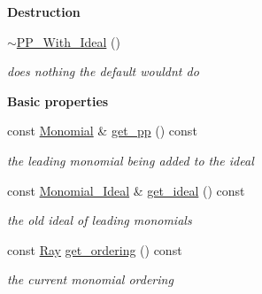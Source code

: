 \begin{Indent}\textbf{ Destruction}\par
\begin{DoxyCompactItemize}
\item 
\mbox{\label{group___g_b_computation_a1dd0ce9a355f10837a180b1599a2666f}} 
\hyperlink{group___g_b_computation_a1dd0ce9a355f10837a180b1599a2666f}{$\sim$\+P\+P\+\_\+\+With\+\_\+\+Ideal} ()
\begin{DoxyCompactList}\small\item\em does nothing the default wouldn\textquotesingle{}t do \end{DoxyCompactList}\end{DoxyCompactItemize}
\end{Indent}
\begin{Indent}\textbf{ Basic properties}\par
\begin{DoxyCompactItemize}
\item 
\mbox{\label{group___g_b_computation_a0b70c63442c37067103f9939b17ef4ec}} 
const \hyperlink{group__polygroup_class_monomial}{Monomial} \& \hyperlink{group___g_b_computation_a0b70c63442c37067103f9939b17ef4ec}{get\+\_\+pp} () const
\begin{DoxyCompactList}\small\item\em the leading monomial being added to the ideal \end{DoxyCompactList}\item 
\mbox{\label{group___g_b_computation_acb57c1467a4d6e622143057fde1ba1b6}} 
const \hyperlink{group__polygroup_class_monomial___ideal}{Monomial\+\_\+\+Ideal} \& \hyperlink{group___g_b_computation_acb57c1467a4d6e622143057fde1ba1b6}{get\+\_\+ideal} () const
\begin{DoxyCompactList}\small\item\em the old ideal of leading monomials \end{DoxyCompactList}\item 
\mbox{\label{group___g_b_computation_af63c24b930505b1a57914234d202417c}} 
const \hyperlink{group___c_l_s_solvers_class_l_p___solvers_1_1_ray}{Ray} \hyperlink{group___g_b_computation_af63c24b930505b1a57914234d202417c}{get\+\_\+ordering} () const
\begin{DoxyCompactList}\small\item\em the current monomial ordering \end{DoxyCompactList}\item 

\end{DoxyCompactItemize}
\end{Indent}
